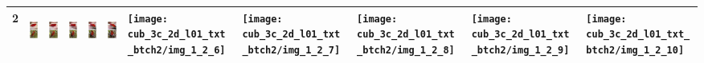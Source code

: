\documentclass{article}
\begin{document}
\begin{table}[H]
\begin{tabularx}{\textwidth}{|c|X|X|X|X|X|X|X|X|X|X|}
2 & \includegraphics[keepaspectratio,height=50px]{cub_3c_2d_l01_txt_btch2/img_1_2_1} & \includegraphics[keepaspectratio,height=50px]{cub_3c_2d_l01_txt_btch2/img_1_2_2} & \includegraphics[keepaspectratio,height=50px]{cub_3c_2d_l01_txt_btch2/img_1_2_3} & \includegraphics[keepaspectratio,height=50px]{cub_3c_2d_l01_txt_btch2/img_1_2_4} & \includegraphics[keepaspectratio,height=50px]{cub_3c_2d_l01_txt_btch2/img_1_2_5} & \texttt{[image: cub\_3c\_2d\_l01\_txt\_btch2/img\_1\_2\_6]} & \texttt{[image: cub\_3c\_2d\_l01\_txt\_btch2/img\_1\_2\_7]} & \texttt{[image: cub\_3c\_2d\_l01\_txt\_btch2/img\_1\_2\_8]} & \texttt{[image: cub\_3c\_2d\_l01\_txt\_btch2/img\_1\_2\_9]} & \texttt{[image: cub\_3c\_2d\_l01\_txt\_btch2/img\_1\_2\_10]} \\\hline

\end{tabularx}
\end{table}
\end{document}
